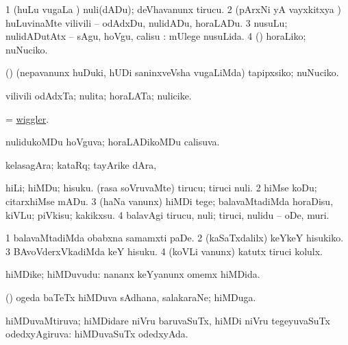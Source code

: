 \begin{center}
\noindent
\gl{\akirx}
\expl{}
\bmng
\bnum
\num{1} (huLu \mo vugaLa \vi) nuli(dADu); deVhavanunx tirucu. 
\num{2} (pArxNi yA vayxkitxya \vi) huLuvinaMte vilivili -- odAdxDu, nulidADu, horaLADu. 
\num{3} nusuLu; nulidADutAtx -- sAgu, hoVgu, calisu :  mUlege nusuLida. 
\num{4} (\rUpa) horaLiko; nuNuciko. 
\enum
\emng

\noindent
\gl{\pagu}
\expl{}
\bmng
{} (\AmA) (nepavanunx huDuki, hUDi saninxveVsha \mo vugaLiMda) tapipxsiko; nuNuciko. 
\emng
\eentry

\bentry
{} 
\gl{\nA}
\expl{}
\bmng
vilivili odAdxTa; nulita; horaLATa; nulicike. 
\emng
\eentry

\bentry
{} 
\gl{\nA}
\expl{}
\bmng
= \hyperlink{wiggler}{wiggler}. 
\emng
\eentry

\bentry
{} 
\gl{\gu}
\expl{}
\bmng
nulidukoMDu hoVguva; horaLADikoMDu calisuva. 
\emng
\eentry

\bentry
{} 
\gl{\nA}
\expl{}
\bmng
kelasagAra; kataRq; tayArike dAra, \udA\  
\emng
\eentry

\bentry
{} 
\gl{\sakirx}
\bmng
\bnum
{} 
\banum
{} hiLi; hiMDu; hisuku. 
 (rasa soVruvaMte) tirucu; tiruci nuli. 
\eanum
\numie
\num{2} hiMse koDu; citarxhiMse mADu. 
\num{3} (haNa \mo vanunx) hiMDi tege; balavaMtadiMda horaDisu, kiVLu; piVkisu; kakikxsu. 
\num{4} balavAgi tirucu, nuli; tiruci, nulidu -- oDe, muri. 
\enum
\emng

\noindent
\gl{\pagu}
\expl{}
\bmng
\bnum
\num{1}  balavaMtadiMda obabxna samamxti paDe. 
\num{2}  (kaSaTxdalilx) keYkeY hisukiko. 
\num{3}  BAvoVderxVkadiMda keY hisuku. 
\num{4}  (koVLi \mo vanunx) katutx tiruci kolulx. 
\enum
\emng
\eentry

\bentry
{} 
\gl{\nA}
\expl{}
\bmng
hiMDike; hiMDuvudu:  nananx keYyanunx omemx hiMDida. 
\emng
\eentry

\bentry
{} 
\gl{\nA}
\expl{}
\bmng
(\kanmu) ogeda baTeTx hiMDuva sAdhana, salakaraNe; hiMDuga. 
\emng
\eentry

\bentry
{} 
\gl{\gu}
\expl{}
\bmng
hiMDuvaMtiruva; hiMDidare niVru baruvaSuTx, hiMDi niVru tegeyuvaSuTx odedxyAgiruva:  hiMDuvaSuTx odedxyAda. 
\emng
\eentry


\end{center}
